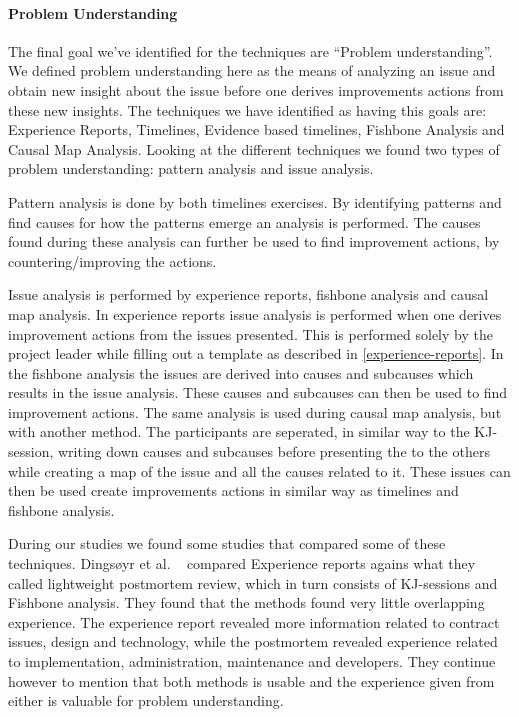 \documentclass[12pt]{article}
\begin{document}
\paragraph{Problem Understanding}
The final goal we've identified for the techniques are ``Problem understanding''. We defined problem understanding here as the means of analyzing an issue and obtain new insight about the issue before one derives improvements actions from these new insights. The techniques we have identified as having this goals are: Experience Reports, Timelines, Evidence based timelines, Fishbone Analysis and Causal Map Analysis. Looking at the different techniques we found two types of problem understanding: pattern analysis and issue analysis. 

Pattern analysis is done by both timelines exercises. By identifying patterns and find causes for how the patterns emerge an analysis is performed. The causes found during these analysis can further be used to find improvement actions, by countering/improving the actions.

Issue analysis is performed by experience reports, fishbone analysis and causal map analysis. In experience reports issue analysis is performed when one derives improvement actions from the issues presented. This is performed solely by the project leader while filling out a template as described in \autoref{experience-reports}. In the fishbone analysis the issues are derived into causes and subcauses which results in the issue analysis. These causes and subcauses can then be used to find improvement actions. The same analysis is used during causal map analysis, but with another method. The participants are seperated, in similar way to the KJ-session, writing down causes and subcauses before presenting the to the others while creating a map of the issue and all the causes related to it. These issues can then be used create improvements actions in similar way as timelines and fishbone analysis. 

During our studies we found some studies that compared some of these techniques. Dingsøyr et al. ~\cite{Moe2001} compared Experience reports agains what they called lightweight postmortem review, which in turn consists of KJ-sessions and Fishbone analysis. They found that the methods found very little overlapping experience. The experience report revealed more information related to contract issues, design and technology, while the postmortem revealed experience related to implementation, administration, maintenance and developers. They continue however to mention that both methods is usable and the experience given from either is valuable for problem understanding. 
\end{document}
